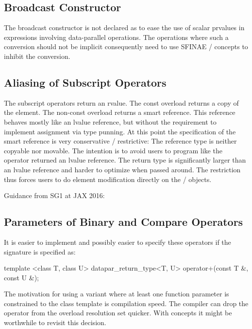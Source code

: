 \subsection{Broadcast Constructor}
The broadcast constructor is not declared as  to ease the use of scalar prvalues in expressions involving data-parallel operations.
The operations where such a conversion should not be implicit consequently need to use SFINAE / concepts to inhibit the conversion.

\subsection{Aliasing of Subscript Operators}
The subscript operators return an rvalue.
The const overload returns a copy of the element.
The non-const overload returns a smart reference.
This reference behaves mostly like an lvalue reference, but without the requirement to implement assignment via type punning.
At this point the specification of the smart reference is very conservative / restrictive:
The reference type is neither copyable nor movable.
The intention is to avoid users to program like the operator returned an lvalue reference.
The return type is significantly larger than an lvalue reference and harder to optimize when passed around.
The restriction thus forces users to do element modification directly on the \datapar / \mask objects.

Guidance from SG1 at JAX 2016:\\


\subsection{Parameters of Binary and Compare Operators}
It is easier to implement and possibly easier to specify these operators if the signature is specified as:
\begin{itemdecl}
template <class T, class U>
datapar_return_type<T, U> operator+(const T &, const U &);
\end{itemdecl}
The motivation for using a variant where at least one function parameter is constrained to the \datapar class template is compilation speed.
The compiler can drop the operator from the overload resolution set quicker.
With concepts it might be worthwhile to revisit this decision.

